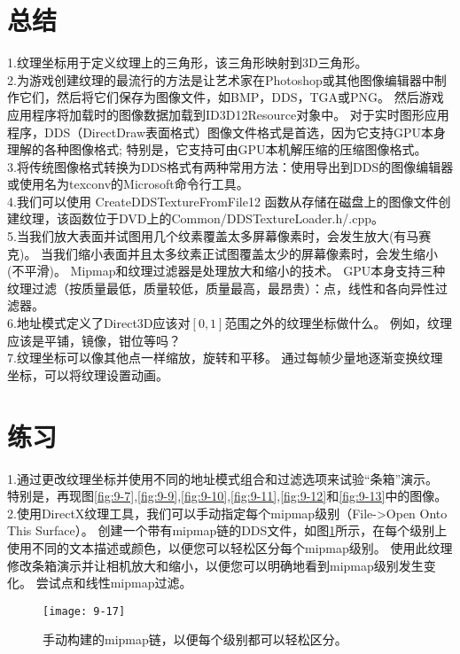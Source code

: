 \section{总结}
\begin{flushleft}
1.纹理坐标用于定义纹理上的三角形，该三角形映射到3D三角形。\\
2.为游戏创建纹理的最流行的方法是让艺术家在Photoshop或其他图像编辑器中制作它们，然后将它们保存为图像文件，如BMP，DDS，TGA或PNG。 然后游戏应用程序将加载时的图像数据加载到ID3D12Resource对象中。 对于实时图形应用程序，DDS（DirectDraw表面格式）图像文件格式是首选，因为它支持GPU本身理解的各种图像格式; 特别是，它支持可由GPU本机解压缩的压缩图像格式。\\
3.将传统图像格式转换为DDS格式有两种常用方法：使用导出到DDS的图像编辑器或使用名为texconv的Microsoft命令行工具。\\
4.我们可以使用 CreateDDSTextureFromFile12 函数从存储在磁盘上的图像文件创建纹理，该函数位于DVD上的Common/DDSTextureLoader.h/.cpp。\\
5.当我们放大表面并试图用几个纹素覆盖太多屏幕像素时，会发生放大(有马赛克)。 当我们缩小表面并且太多纹素正试图覆盖太少的屏幕像素时，会发生缩小(不平滑)。 Mipmap和纹理过滤器是处理放大和缩小的技术。 GPU本身支持三种纹理过滤（按质量最低，质量较低，质量最高，最昂贵）：点，线性和各向异性过滤器。\\
6.地址模式定义了Direct3D应该对$[0,1]$范围之外的纹理坐标做什么。 例如，纹理应该是平铺，镜像，钳位等吗？\\
7.纹理坐标可以像其他点一样缩放，旋转和平移。 通过每帧少量地逐渐变换纹理坐标，可以将纹理设置动画。
\end{flushleft}

\section{练习}
\begin{flushleft}
1.通过更改纹理坐标并使用不同的地址模式组合和过滤选项来试验“条箱”演示。 特别是，再现图\ref{fig:9-7},\ref{fig:9-9},\ref{fig:9-10},\ref{fig:9-11},\ref{fig:9-12}和\ref{fig:9-13}中的图像。\\
2.使用DirectX纹理工具，我们可以手动指定每个mipmap级别（File->Open Onto This Surface）。 创建一个带有mipmap链的DDS文件，如图\ref{fig:9-17}所示，在每个级别上使用不同的文本描述或颜色，以便您可以轻松区分每个mipmap级别。 使用此纹理修改条箱演示并让相机放大和缩小，以便您可以明确地看到mipmap级别发生变化。 尝试点和线性mipmap过滤。\\
\end{flushleft}
\begin{figure}[h]
    \texttt{[image: 9-17]}
    \centering
    \caption{手动构建的mipmap链，以便每个级别都可以轻松区分。}
    \label{fig:9-17}
\end{figure}

